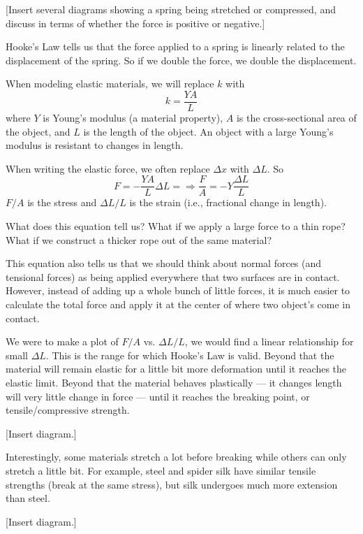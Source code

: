 [Insert several diagrams showing a spring being stretched or compressed, and discuss in terms of whether the force is positive or negative.]
\vspace{5cm}

Hooke's Law tells us that the force applied to a spring is linearly related to the displacement of the spring. So if we double the force, we double the displacement. 

When modeling elastic materials, we will replace $k$ with
$$k=\frac{YA}{L}$$
where $Y$ is Young's modulus (a material property), $A$ is the cross-sectional area of the object, and $L$ is the length of the object. An object with a large Young's modulus is resistant to changes in length.

When writing the elastic force, we often replace $\Delta{x}$ with $\Delta{L}$. So
$$F=-\frac{YA}{L}\Delta{L}=\Rightarrow \frac{F}{A}=-Y\frac{\Delta{L}}{L}$$
$F/A$ is the stress and $\Delta{L}/L$ is the strain (i.e., fractional change in length).

What does this equation tell us? What if we apply a large force to a thin rope? What if we construct a thicker rope out of the same material?

This equation also tells us that we should think about normal forces (and tensional forces) as being applied everywhere that two surfaces are in contact. However, instead of adding up a whole bunch of little forces, it is much easier to calculate the total force and apply it at the center of where two object's come in contact.

We were to make a plot of $F/A$ vs. $\Delta{L}/L$, we would find a linear relationship for small $\Delta{L}$. This is the range for which Hooke's Law is valid. Beyond that the material will remain elastic for a little bit more deformation until it reaches the elastic limit. Beyond that the material behaves plastically --- it changes length will very little change in force --- until it reaches the breaking point, or tensile/compressive strength.

[Insert diagram.]
\vspace{5cm}

Interestingly, some materials stretch a lot before breaking while others can only stretch a little bit. For example, steel and spider silk have similar tensile strengths (break at the same stress), but silk undergoes much more extension than steel.

[Insert diagram.]
\vspace{5cm}

